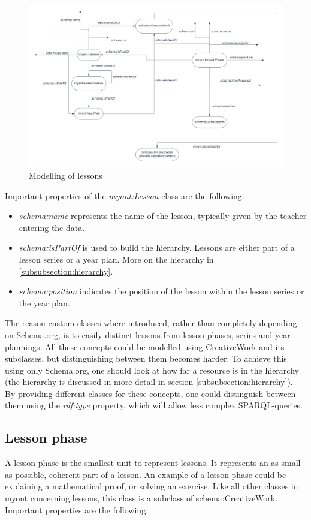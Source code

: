\documentclass[a4paper]{report}
\begin{document}
    \begin{figure}[h]
    \caption{Modelling of lessons}
    \label{fig:uml-lesson}
    \includegraphics[scale=0.5]{uml-lessons.png}
    \end{figure}
    Important properties of the \textit{myont:Lesson} class are the following:

    \begin{itemize}
        \item \emph{schema:name} represents the name of the lesson, typically given by the teacher entering the data.
        \item \emph{schema:isPartOf} is used to build the hierarchy. Lessons are either part of a lesson series or a year plan. More on the hierarchy in \ref{subsubsection:hierarchy}.
        \item \emph{schema:position} indicates the position of the lesson within the lesson series or the year plan.
    \end{itemize}
    The reason custom classes where introduced, rather than completely depending on Schema.org, is to easily distinct lessons from lesson phases, series and year plannings. All these concepts could be modelled using CreativeWork and its subclasses, but distinguishing between them becomes harder.
    To achieve this using only Schema.org, one should look at how far a resource is in the hierarchy (the hierarchy is discussed in more detail in section \ref{subsubsection:hierarchy}).\\
    By providing different classes for these concepts, one could distinguish between them using the \textit{rdf:type} property, which will allow less complex SPARQL-queries.

    \subsection{Lesson phase}
    A lesson phase is the smallest unit to represent lessons. It represents an as small as possible, coherent part of a lesson. An example of a lesson phase could be explaining a mathematical proof, or solving an exercise.
    Like all other classes in myont concerning lessons, this class is a subclass of schema:CreativeWork. Important properties are the following:
\end{document}
